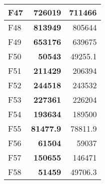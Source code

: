\begin{table}[]
\begin{tabular}{lrr|}
\multicolumn{1}{|l|}{\cellcolor[HTML]{FCE6AB}F47} & \multicolumn{1}{r|}{\cellcolor[HTML]{D3FFB6}\textbf{726019}}  & 711466                                                    \\ \hline
\multicolumn{1}{|l|}{\cellcolor[HTML]{FCE6AB}F48} & \multicolumn{1}{r|}{\cellcolor[HTML]{D3FFB6}\textbf{813949}}  & 805644                                                    \\ \hline
\multicolumn{1}{|l|}{\cellcolor[HTML]{FCE6AB}F49} & \multicolumn{1}{r|}{\cellcolor[HTML]{D3FFB6}\textbf{653176}}  & 639675                                                    \\ \hline
\multicolumn{1}{|l|}{\cellcolor[HTML]{FCE6AB}F50} & \multicolumn{1}{r|}{\cellcolor[HTML]{D3FFB6}\textbf{50543}}   & 49255.1                                                   \\ \hline
\multicolumn{1}{|l|}{\cellcolor[HTML]{FCE6AB}F51} & \multicolumn{1}{r|}{\cellcolor[HTML]{D3FFB6}\textbf{211429}}  & 206394                                                    \\ \hline
\multicolumn{1}{|l|}{\cellcolor[HTML]{FCE6AB}F52} & \multicolumn{1}{r|}{\cellcolor[HTML]{D3FFB6}\textbf{244518}}  & 243532                                                    \\ \hline
\multicolumn{1}{|l|}{\cellcolor[HTML]{FCE6AB}F53} & \multicolumn{1}{r|}{\cellcolor[HTML]{D3FFB6}\textbf{227361}}  & 226204                                                    \\ \hline
\multicolumn{1}{|l|}{\cellcolor[HTML]{FCE6AB}F54} & \multicolumn{1}{r|}{\cellcolor[HTML]{D3FFB6}\textbf{193634}}  & 189500                                                    \\ \hline
\multicolumn{1}{|l|}{\cellcolor[HTML]{FCE6AB}F55} & \multicolumn{1}{r|}{\cellcolor[HTML]{D3FFB6}\textbf{81477.9}} & 78811.9                                                   \\ \hline
\multicolumn{1}{|l|}{\cellcolor[HTML]{FCE6AB}F56} & \multicolumn{1}{r|}{\cellcolor[HTML]{D3FFB6}\textbf{61504}}   & 59037                                                     \\ \hline
\multicolumn{1}{|l|}{\cellcolor[HTML]{FCE6AB}F57} & \multicolumn{1}{r|}{\cellcolor[HTML]{D3FFB6}\textbf{150655}}  & 146471                                                    \\ \hline
\multicolumn{1}{|l|}{\cellcolor[HTML]{FCE6AB}F58} & \multicolumn{1}{r|}{\cellcolor[HTML]{D3FFB6}\textbf{51459}}   & 49706.3                                                   \\ \hline

\end{tabular}
\end{table}
